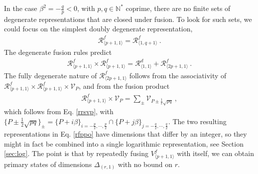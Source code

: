 \documentclass[12pt, a4paper]{article}
\theoremstyle{break}
\begin{document}
In the case $\beta^2=-\frac{q}{p}<0$, with $p,q\in\mathbb{N}^*$ coprime, there are no finite sets of degenerate representations that are closed under fusion. To look for such sets, we could focus on the simplest doubly degenerate representation, 
\begin{align}
 \mathcal{R}^f_{\langle p+1,1\rangle}=\mathcal{R}^f_{\langle 1,q+1\rangle}\ .
\end{align}
The degenerate fusion rules predict  
\begin{align}
 \mathcal{R}^f_{\langle p+1,1\rangle}\times \mathcal{R}^f_{\langle p+1,1\rangle} = \mathcal{R}^d_{\langle 1,1\rangle} + \mathcal{R}^f_{\langle 2p+1,1\rangle}\ .
 \label{rfppo}
\end{align}
The fully degenerate nature of $\mathcal{R}^f_{\langle 2p+1,1\rangle}$ follows from the associativity of $\mathcal{R}^f_{\langle p+1,1\rangle}\times \mathcal{R}^f_{\langle p+1,1\rangle}\times \mathcal{V}_P$, and from the fusion product
\begin{align}
 \mathcal{R}^f_{\langle p+1,1\rangle} \times \mathcal{V}_P = \sum_{\pm} \mathcal{V}_{P\pm \frac12\sqrt{pq}}\ ,
\end{align}
which follows from Eq. \eqref{rrsvp}, with $\{P\pm \frac12\sqrt{pq}\}_\pm = \{P+i\beta\}_{i=-\frac{p}{2},\cdots, \frac{p}{2}} \cap \{P+j\beta\}_{j=-\frac{q}{2},\cdots, \frac{q}{2}}$. 
The two resulting representations in Eq. \eqref{rfppo} have dimensions that differ by an integer, so they might in fact be combined into a single logarithmic representation, see Section \ref{sec:log}. The point is that by repeatedly fusing $V^f_{\langle p+1,1\rangle}$ with itself, we can obtain primary states of dimensions $\Delta_{(r,1)}$ with no bound on $r$. 
\end{document}
